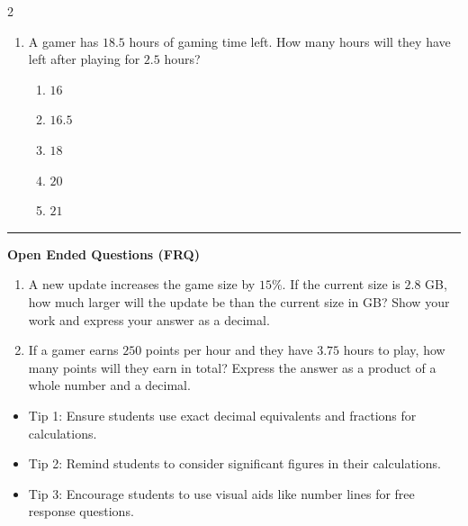 \documentclass[10pt]{article}
\begin{document}
\begin{multicols}{2}
\begin{enumerate}[label=\textbf{Q\arabic*.}, leftmargin=*, itemsep=6pt, parsep=0pt]
  \item \small A gamer has $18.5$ hours of gaming time left. How many hours will they have left after playing for $2.5$ hours?
  \begin{enumerate}[label=(\Alph*), leftmargin=0.6cm, nosep, itemsep=2pt]
    \item $16$
    \item $16.5$
    \item $18$
    \item $20$
    \item $21$
  \end{enumerate}

\end{enumerate}
\end{multicols}

\vspace{-0.2cm}
\hrule
\vspace{0.2cm}
\textbf{\small Open Ended Questions (FRQ)}
\begin{enumerate}[label=\textbf{Q\arabic*.}, start=9, itemsep=5pt, topsep=0pt]

  \item \small A new update increases the game size by $15\%$. If the current size is $2.8$ GB, how much larger will the update be than the current size in GB? Show your work and express your answer as a decimal. \vspace{2cm}

  \item \small If a gamer earns $250$ points per hour and they have $3.75$ hours to play, how many points will they earn in total? Express the answer as a product of a whole number and a decimal. \vspace{2cm}

\end{enumerate}

\vfill

\begin{tcolorbox}[colback=blue!5, colframe=mainblue!50, title=\small \textbf{Chef's Tips}, fonttitle=\bfseries, bottom=1mm]
\begin{itemize}[noitemsep, topsep=2pt, leftmargin=0.5cm]
  \item \scriptsize Tip 1: Ensure students use exact decimal equivalents and fractions for calculations.\item \scriptsize Tip 2: Remind students to consider significant figures in their calculations.\item \scriptsize Tip 3: Encourage students to use visual aids like number lines for free response questions.
\end{itemize}
\end{tcolorbox}
\end{document}
